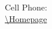 

\address{%
\ifthenelse{\equal{\CurrentDepartmentName}{}}{}%
{\CurrentDepartmentName\\}
\ifthenelse{\equal{\CurrentUniversityName}{}}{}%
{\CurrentUniversityName\\}
\ifthenelse{\equal{\CurrentUniversityAddress}{}}{}%
{\CurrentUniversityAddress\\}
}%
{%
\ifthenelse{\equal{\FirstEmail}{}}{}%
{\href{mailto:\FirstEmail}{\textrm{\FirstEmail}}\\}
\ifthenelse{\equal{\SecondEmail}{}}{}%
{\href{mailto:\SecondEmail}{\textrm{\SecondEmail}}\\}
\ifthenelse{\equal{\CellPhone}{}}{}%
{Cell Phone: \CellPhone\\}
\ifthenelse{\equal{\Homepage}{}}{}%
{\href{\Homepage}{\url{\Homepage}}\\}
\LastUpdate\\
}

